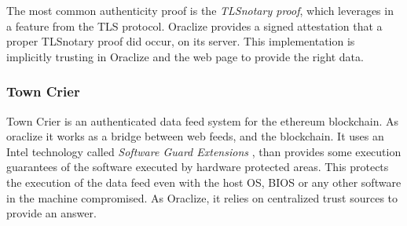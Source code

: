 The most common authenticity proof is the \textit{TLSnotary proof}, which leverages
  in a feature from the TLS protocol.
Oraclize provides a signed attestation that a proper TLSnotary proof did occur,
  on its server.
This implementation is implicitly trusting in Oraclize and the web page to
  provide the right data.

\subsubsection{Town Crier}
Town Crier \cite{zhang2016town} is an authenticated data feed system for
  the ethereum blockchain.
As oraclize it works as a bridge between web feeds, and the blockchain.
It uses an Intel technology called \textit{Software Guard Extensions}
  \cite{costan2016intel}, than provides some execution guarantees of the software
  executed by hardware protected areas.
This protects the execution of the data feed even with the host OS, BIOS or
  any other software in the machine compromised.
As Oraclize, it relies on centralized trust sources to provide an answer.
